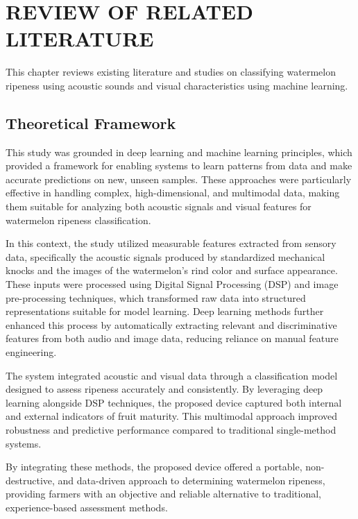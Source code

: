 \chapter{REVIEW OF RELATED LITERATURE}

\begin{thesisprose}

This chapter reviews existing literature and studies on classifying watermelon ripeness using acoustic sounds and visual characteristics using machine learning.

\section{Theoretical Framework}

This study was grounded in deep learning and machine learning principles, which provided a framework for enabling systems to learn patterns from data and make accurate predictions on new, unseen samples. These approaches were particularly effective in handling complex, high-dimensional, and multimodal data, making them suitable for analyzing both acoustic signals and visual features for watermelon ripeness classification.

In this context, the study utilized measurable features extracted from sensory data, specifically the acoustic signals produced by standardized mechanical knocks and the images of the watermelon's rind color and surface appearance. These inputs were processed using Digital Signal Processing (DSP) and image pre-processing techniques, which transformed raw data into structured representations suitable for model learning. Deep learning methods further enhanced this process by automatically extracting relevant and discriminative features from both audio and image data, reducing reliance on manual feature engineering.

The system integrated acoustic and visual data through a classification model designed to assess ripeness accurately and consistently. By leveraging deep learning alongside DSP techniques, the proposed device captured both internal and external indicators of fruit maturity. This multimodal approach improved robustness and predictive performance compared to traditional single-method systems.

By integrating these methods, the proposed device offered a portable, non-destructive, and data-driven approach to determining watermelon ripeness, providing farmers with an objective and reliable alternative to traditional, experience-based assessment methods.


\end{thesisprose}
